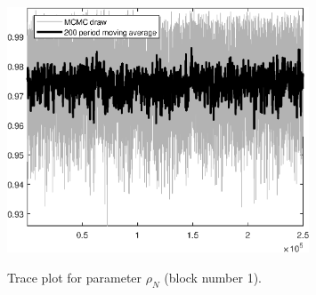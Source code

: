 \begin{figure}[H]
\centering
  \includegraphics[width=0.8\textwidth]{BRS_growth_ext_comovement/graphs/TracePlot_rho_N_blck_1}\\
    \caption{Trace plot for parameter ${\rho_N}$ (block number 1).}
\end{figure}
